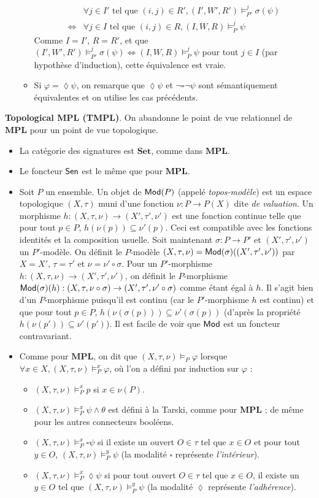 \documentclass[11pt,a4paper]{article}
\newcommand{\ph}{\varphi}
\newcommand{\itemz}{\item[$\triangleright$]}
\newcommand{\gr}{\textbf}
\newcommand{\il}{\textit}
\renewcommand{\iff}{\Leftrightarrow}
\newcommand{\info}[1]{\text{{\fontfamily{lmss}\selectfont #1}}}
\newcommand{\Mod}{\info{Mod}}
\newcommand{\Sen}{\info{Sen}}
\newcommand{\1}{\mathbbm{1}}
\begin{document}
\begin{itemize}
\begin{itemize}
\begin{align*} & \forall j \in I' \text{ tel que } (i,j) \in R', (I',W',R') \models^j_{P'} \sigma(\psi) \\ \iff & \forall j \in I \text{ tel que } (i,j) \in R, (I,W,R) \models^j_P \psi
\end{align*}
Comme $I = I'$, $R = R'$, et que $(I',W',R') \models^j_{P'} \sigma(\psi) \iff (I,W,R) \models^j_{P} \psi$ pour tout $j \in I$ (par hypothèse d'induction), cette équivalence est vraie.
\item Si $\ph = \lozenge \psi$, on remarque que $\lozenge \psi$ et $\neg \square \neg \psi$ sont sémantiquement équivalentes et on utilise les cas précédents.
\end{itemize}
\end{itemize}
\gr{Topological MPL (TMPL)}. On abandonne le point de vue relationnel de $\gr{MPL}$ pour un point de vue topologique.
\begin{itemize}
\itemz La catégorie des signatures est $\gr{Set}$, comme dans $\gr{MPL}$.
\itemz Le foncteur $\Sen$ est le même que pour $\gr{MPL}$.
\itemz Soit $P$ un ensemble. Un objet de $\Mod(P)$ (appelé \il{topos-modèle}) est un espace topologique $(X,\tau)$ muni d'une fonction $\nu : P \to P(X)$ dite \il{de valuation}. Un morphisme $h : (X,\tau,\nu) \to (X',\tau',\nu')$ est une fonction continue telle que pour tout $p \in P$, $h(\nu(p)) \subseteq \nu'(p)$. Ceci est compatible avec les fonctions identités et la composition usuelle. Soit maintenant $\sigma : P \to P'$ et $(X',\tau',\nu')$ un $P'$-modèle. On définit le $P$-modèle $(X,\tau,\nu) = \Mod(\sigma)((X',\tau',\nu'))$ par $X = X'$, $\tau = \tau'$ et $\nu = \nu' \circ \sigma$. Pour un $P'$-morphisme $h : (X,\tau,\nu) \to (X',\tau',\nu')$, on définit le $P$-morphisme $\Mod(\sigma)(h) : (X,\tau, \nu\circ\sigma) \to (X',\tau',\nu'\circ\sigma)$ comme étant égal à $h$. Il s'agit bien d'un $P$-morphisme puisqu'il est continu (car le $P'$-morphisme $h$ est continu) et que pour tout $p \in P$, $h(\nu(\sigma(p))) \subseteq \nu'(\sigma(p))$ (d'après la propriété $h(\nu(p')) \subseteq \nu'(p')$). Il est facile de voir que $\Mod$ est un foncteur contravariant.
\itemz Comme pour $\gr{MPL}$, on dit que $(X,\tau,\nu) \models_P \ph$ lorsque $\forall x \in X, (X,\tau,\nu) \models_P^x \ph$, où l'on a défini par induction sur $\ph$ :
\begin{itemize}
\setlength\itemsep{-0.3em}
\item $(X,\tau,\nu) \models_P^x p$ si $x \in \nu(P)$.
\item $(X,\tau,\nu) \models_P^x \psi \wedge \theta$ est défini à la Tarski, comme pour $\gr{MPL}$ ; de même pour les autres connecteurs booléens.
\item $(X,\tau,\nu) \models_P^x \square \psi$ si il existe un ouvert $O \in \tau$ tel que $x \in O$ et pour tout $y \in O$, $(X,\tau,\nu) \models_P^y \psi$ (la modalité $\square$ représente \il{l'intérieur}).
\item $(X,\tau,\nu) \models_P^x \lozenge \psi$ si pour tout ouvert $O \in \tau$ tel que $x \in O$, il existe un $y \in O$ tel que $(X,\tau,\nu) \models_P^y \psi$ (la modalité $\lozenge$ représente \il{l'adhérence}).
\end{itemize}
\end{itemize}
\end{document}
